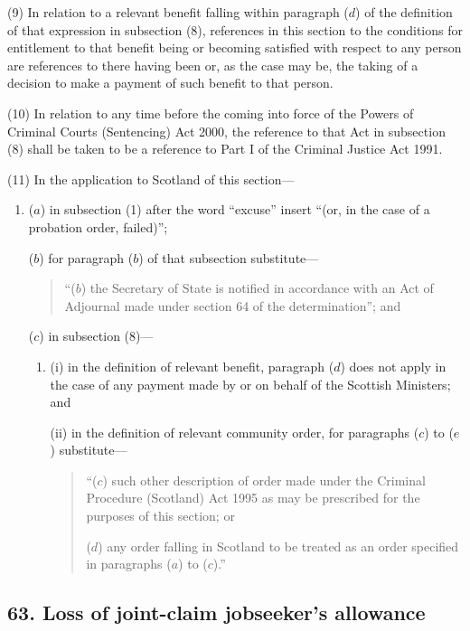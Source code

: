\documentclass[12pt,a4paper]{article}
\begin{document}
(9) In relation to a relevant benefit falling within paragraph ($d$)  of the definition of that expression in subsection (8), references in this section to the conditions for entitlement to that benefit being or becoming satisfied with respect to any person are references to there having been or, as the case may be, the taking of a decision to make a payment of such benefit to that person.

(10) In relation to any time before the coming into force of the Powers of Criminal Courts (Sentencing) Act 2000, the reference to that Act in subsection (8)  shall be taken to be a reference to Part I of the Criminal Justice Act 1991. 

(11) In the application to Scotland of this section—
\begin{enumerate}\item[]
($a$) in subsection (1)  after the word “excuse” insert “(or, in the case of a probation order, failed)”;

($b$) for paragraph ($b$)  of that subsection substitute—
\begin{quotation}
“($b$) the Secretary of State is notified in accordance with an Act of Adjournal made under section 64 of the determination”; and
\end{quotation}

($c$) in subsection (8)—
\begin{enumerate}\item[]
(i) in the definition of relevant benefit, paragraph ($d$)  does not apply in the case of any payment made by or on behalf of the Scottish Ministers; and

(ii) in the definition of relevant community order, for paragraphs ($c$)  to ($e$)  substitute—
\begin{quotation}
“($c$) such other description of order made under the Criminal Procedure (Scotland) Act 1995 as may be prescribed for the purposes of this section; or

($d$) any order falling in Scotland to be treated as an order specified in paragraphs ($a$)  to ($c$).”
\end{quotation}
\end{enumerate}
\end{enumerate}


\subsection{63. Loss of joint-claim jobseeker’s allowance}
\end{document}
